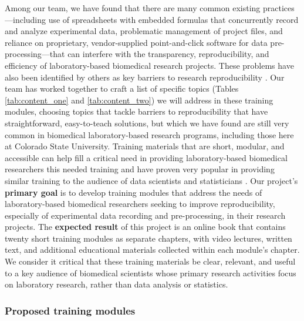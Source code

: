 \documentclass[pdftex,english,11pt,parskip=half]{scrartcl}
\begin{document}
Among our team, we have
found that there are many common existing practices---including use of
spreadsheets with embedded formulas that concurrently record and analyze
experimental data, problematic management of project files,
and reliance on proprietary, vendor-supplied point-and-click software for data
pre-processing---that can interfere with the transparency, reproducibility, and
efficiency of laboratory-based biomedical research projects. These problems have also been 
identified by others as key barriers to research reproducibility 
\cite{broman2018data, bryan2018excuse, ellis2018share, marwick2018packaging}.
Our team has worked together to craft a list of
specific topics (Tables \ref{tab:content_one} and \ref{tab:content_two}) we will address in these training modules, choosing topics that tackle barriers to reproducibility that have
straightforward, easy-to-teach solutions, but which we have found are still very common in
biomedical laboratory-based research programs, including those here at Colorado
State University. Training materials that are short, 
modular, and accessible can help fill a critical need in providing laboratory-based biomedical researchers this needed
training \cite{munafo2017manifesto} and have proven very popular in providing 
similar training to the audience of data scientists and statisticians \cite{leek2015opinion}. Our project's \textbf{primary goal} is to develop
training modules that address the needs of laboratory-based biomedical
researchers seeking to improve reproducibility, especially of experimental data
recording and pre-processing, in their research projects. The \textbf{expected result} of
this project is an online book that contains twenty short training modules as separate
chapters, with video lectures, written text, and additional educational
materials collected within each module's chapter. We consider it critical that
these training materials be clear, relevant, and useful to a key audience of
biomedical scientists whose primary research activities focus on laboratory
research, rather than data analysis or statistics. 

\subsubsection*{Proposed training modules}
\end{document}
